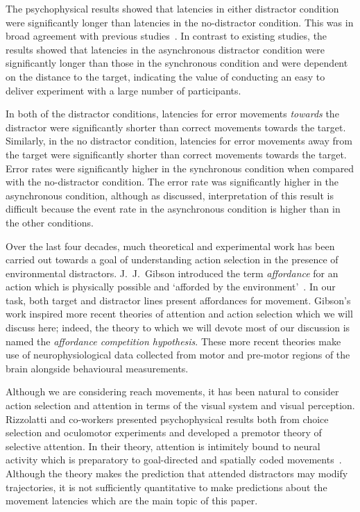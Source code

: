\documentclass[10pt,letterpaper]{article}
\begin{document}

The psychophysical results showed that latencies in either distractor
condition were significantly longer than latencies in the
no-distractor condition. This was in broad agreement with previous
studies~\cite{tipper_selective_1992,meegan_visual_1999,pratt_action-centered_1994}.
In contrast to existing studies, the results showed that latencies in
the asynchronous distractor condition were significantly longer than
those in the synchronous condition and were dependent on the distance
to the target, indicating the value of conducting an easy to deliver
experiment with a large number of participants.

In both of the distractor conditions, latencies for error movements
\emph{towards} the distractor were significantly shorter than correct
movements towards the target. Similarly, in the no distractor
condition, latencies for error movements away from the target were
significantly shorter than correct movements towards the target. Error
rates were significantly higher in the synchronous condition when
compared with the no-distractor condition. The error rate was
significantly higher in the asynchronous condition, although as
discussed, interpretation of this result is difficult because the
event rate in the asynchronous condition is higher than in the other
conditions.

Over the last four decades, much theoretical and experimental work has
been carried out towards a goal of understanding action selection in
the presence of environmental distractors. J.~J.~Gibson introduced the
term \emph{affordance} for an action which is physically possible and
`afforded by the environment'~\cite{gibson_ecological_1979}. In our
task, both target and distractor lines present affordances for
movement. Gibson's work inspired more recent theories of attention and
action selection which we will discuss here; indeed, the theory to
which we will devote most of our discussion is named the
\emph{affordance competition hypothesis}. These more recent theories
make use of neurophysiological data collected from motor and pre-motor
regions of the brain alongside behavioural measurements.

Although we are considering reach movements, it has been natural to
consider action selection and attention in terms of the visual system
and visual perception. Rizzolatti and co-workers presented
psychophysical results both from choice selection and oculomotor
experiments and developed a premotor theory of selective attention. In
their theory, attention is intimitely bound to neural activity which
is preparatory to goal-directed and spatially coded
movements~\cite{rizzolatti_space_1994}. Although the theory makes the
prediction that attended distractors may modify trajectories, it is
not sufficiently quantitative to make predictions about the movement
latencies which are the main topic of this paper.
\end{document}
